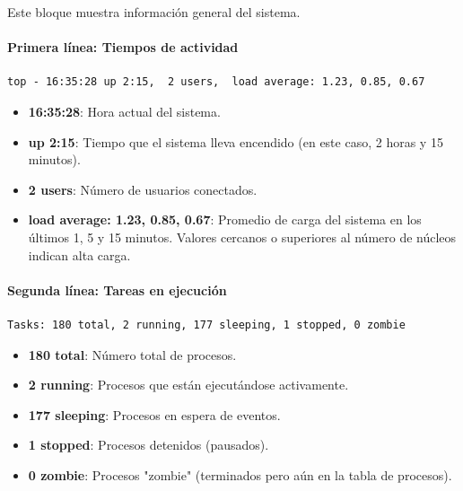 Este bloque muestra información general del sistema.

\paragraph{Primera línea: Tiempos de actividad}
\begin{verbatim}
top - 16:35:28 up 2:15,  2 users,  load average: 1.23, 0.85, 0.67
\end{verbatim}
\begin{itemize}
  \item \textbf{16:35:28}: Hora actual del sistema.
  \item \textbf{up 2:15}: Tiempo que el sistema lleva encendido (en este caso, 2 horas y 15 minutos).
  \item \textbf{2 users}: Número de usuarios conectados.
  \item \textbf{load average: 1.23, 0.85, 0.67}: Promedio de carga del sistema en los últimos 1, 5 y 15 minutos. Valores cercanos o superiores al número de núcleos indican alta carga.
\end{itemize}

\paragraph{Segunda línea: Tareas en ejecución}
\begin{verbatim}
Tasks: 180 total, 2 running, 177 sleeping, 1 stopped, 0 zombie
\end{verbatim}
\begin{itemize}
  \item \textbf{180 total}: Número total de procesos.
  \item \textbf{2 running}: Procesos que están ejecutándose activamente.
  \item \textbf{177 sleeping}: Procesos en espera de eventos.
  \item \textbf{1 stopped}: Procesos detenidos (pausados).
  \item \textbf{0 zombie}: Procesos "zombie" (terminados pero aún en la tabla de procesos).
\end{itemize}

